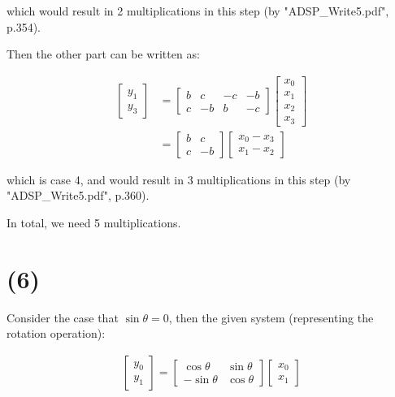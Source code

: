 \documentclass{article}
\begin{document}
which would result in 2 multiplications in this step (by "ADSP\_Write5.pdf", p.354).
\bigskip

Then the other part can be written as:

\begin{align*}
    \begin{bmatrix}
        y_1 \\
        y_3
    \end{bmatrix}
    &= \begin{bmatrix}
        b & c & -c & -b \\
        c & -b & b & -c
    \end{bmatrix}
    \begin{bmatrix}
        x_0 \\
        x_1 \\
        x_2 \\
        x_3
    \end{bmatrix} \\
    &= \begin{bmatrix}
        b & c \\
        c & -b
    \end{bmatrix}
    \begin{bmatrix}
        x_0 - x_3 \\
        x_1 - x_2
    \end{bmatrix}
\end{align*}

which is case 4, and would result in 3 multiplications in this step (by "ADSP\_Write5.pdf", p.360).

\bigskip

In total, we need 5 multiplications.

\section*{(6)}

Consider the case that $\sin \theta = 0$, then the given system (representing the rotation operation):

\begin{align*}
    \begin{bmatrix}
        y_0 \\
        y_1 
    \end{bmatrix}
    = 
    \begin{bmatrix}
        \cos \theta & \sin \theta \\
        -\sin \theta & \cos \theta
    \end{bmatrix}
    \begin{bmatrix}
        x_0 \\
        x_1
    \end{bmatrix}
\end{align*}
\end{document}
